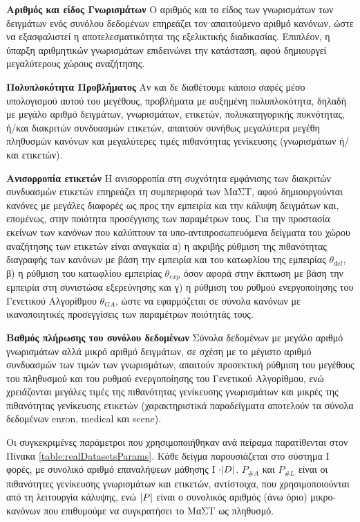 \begin{description}
\item \textbf{Αριθμός και είδος Γνωρισμάτων} Ο αριθμός και το είδος των γνωρισμάτων των δειγμάτων ενός συνόλου δεδομένων επηρεάζει τον απαιτούμενο αριθμό κανόνων, ώστε να εξασφαλιστεί η αποτελεσματικότητα της εξελικτικής διαδικασίας. Επιπλέον, η ύπαρξη αριθμητικών γνωρισμάτων επιδεινώνει την κατάσταση, αφού δημιουργεί μεγαλύτερους χώρους αναζήτησης.
\item \textbf{Πολυπλοκότητα Προβλήματος} Αν και δε διαθέτουμε κάποιο σαφές μέσο υπολογισμού αυτού του μεγέθους, προβλήματα με αυξημένη πολυπλοκότητα, δηλαδή με μεγάλο αριθμό δειγμάτων, γνωρισμάτων, ετικετών, πολυκατηγορικής πυκνότητας, ή/και διακριτών συνδυασμών ετικετών, απαιτούν συνήθως μεγαλύτερα μεγέθη πληθυσμών κανόνων και μεγαλύτερες τιμές πιθανότητας γενίκευσης (γνωρισμάτων ή/και ετικετών).
\item \textbf{Ανισορροπία ετικετών} Η ανισορροπία στη συχνότητα εμφάνισης των διακριτών συνδυασμών ετικετών επηρεάζει τη συμπεριφορά των ΜαΣΤ, αφού δημιουργούνται κανόνες με μεγάλες διαφορές ως προς την εμπειρία και την κάλυψη δειγμάτων και, επομένως, στην ποιότητα προσέγγισης των παραμέτρων τους. Για την προστασία εκείνων των κανόνων που καλύπτουν τα υπο-αντιπροσωπευόμενα δείγματα του χώρου αναζήτησης των ετικετών είναι αναγκαία α) η ακριβής ρύθμιση της πιθανότητας διαγραφής των κανόνων με βάση την εμπειρία και του κατωφλίου της εμπειρίας $\theta_{del}$, β) η ρύθμιση του κατωφλίου εμπειρίας $\theta_{exp}$ όσον αφορά στην έκπτωση με βάση την εμπειρία στη συνιστώσα εξερεύνησης και γ) η ρύθμιση του ρυθμού ενεργοποίησης του Γενετικού Αλγορίθμου $\theta_{GA}$, ώστε να εφαρμόζεται σε σύνολα κανόνων με ικανοποιητικές προσεγγίσεις των παραμέτρων ποιότητάς τους.
\item \textbf{Βαθμός πλήρωσης του συνόλου δεδομένων} Σύνολα δεδομένων με μεγάλο αριθμό γνωρισμάτων αλλά μικρό αριθμό δειγμάτων, σε σχέση με το μέγιστο αριθμό συνδυασμών των τιμών των γνωρισμάτων, απαιτούν προσεκτική ρύθμιση του μεγέθους του πληθυσμού και του ρυθμού ενεργοποίησης του Γενετικού Αλγορίθμου, ενώ χρειάζονται μεγάλες τιμές της πιθανότητας γενίκευσης γνωρισμάτων και μικρές της πιθανότητας γενίκευσης ετικετών (χαρακτηριστικά παραδείγματα αποτελούν τα σύνολα δεδομένων enron, medical και scene).
\end{description}

Οι συγκεκριμένες παράμετροι που χρησιμοποιήθηκαν ανά πείραμα παρατίθενται στον Πίνακα \ref{table:realDatasetsParams}. Κάθε δείγμα παρουσιάζεται στο σύστημα I φορές, με συνολικό αριθμό επαναλήψεων μάθησης I $\cdot \lvert D\rvert$. $P_{\#A}$ και $P_{\#L}$ είναι οι πιθανότητες γενίκευσης γνωρισμάτων και ετικετών, αντίστοιχα, που χρησιμοποιούνται από τη λειτουργία κάλυψης, ενώ $\lvert P\rvert$ είναι ο συνολικός αριθμός (άνω όριο) μικρο-κανόνων που επιθυμούμε να συγκρατήσει το ΜαΣΤ ως πληθυσμό.

